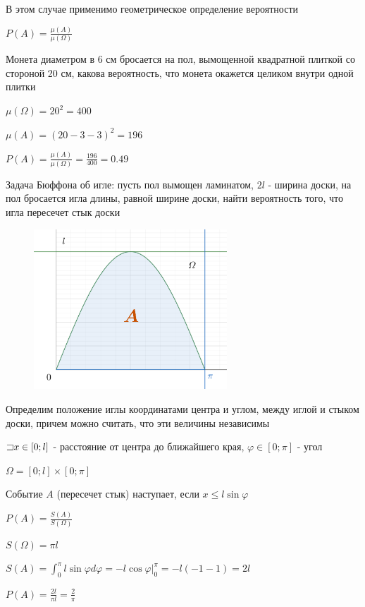 \documentclass[12pt]{article}
\begin{document}
    В этом случае применимо геометрическое определение вероятности

    $P(A) = \frac{\mu(A)}{\mu(\Omega)}$

     Монета диаметром в 6 см бросается на пол, вымощенной квадратной плиткой со стороной 20 см, какова вероятность,
    что монета окажется целиком внутри одной плитки

    $\mu(\Omega) = 20^2 = 400$

    $\mu(A) = (20 - 3 - 3)^2 = 196$

    $P(A) = \frac{\mu(A)}{\mu(\Omega)} = \frac{196}{400} = 0.49$

    \hypertarget{buffonsproblem}{}

     Задача Бюффона об игле: пусть пол вымощен ламинатом, $2l$ - ширина доски, на пол бросается игла длины, равной ширине доски,
    найти вероятность того, что игла пересечет стык доски

    \smallvspace

    \begin{minipage}{\linewidth}
        \begin{figure}
            \includegraphics[height=6cm]{probtheory/images/probtheory_2024_09_03_1}
        \end{figure}

        Определим положение иглы координатами центра и углом, между иглой и стыком доски, причем можно считать, что эти величины независимы

        $\mathord{\sqsupset} x \in [0; l]$ - расстояние от центра до ближайшего края, $\varphi \in [0; \pi]$ - угол

        $\Omega = [0; l] \times [0; \pi]$

        Событие $A$ (пересечет стык) наступает, если $x \leq l \sin \varphi$

        $P(A) = \frac{S(A)}{S(\Omega)}$

        $S(\Omega) = \pi l$

        $S(A) = \int_0^\pi l \sin \varphi d\varphi = -l \cos \varphi \Big|_0^\pi = -l (-1 - 1) = 2l$

        $P(A) = \frac{2l}{\pi l} = \frac{2}{\pi}$
    \end{minipage}
\end{document}
